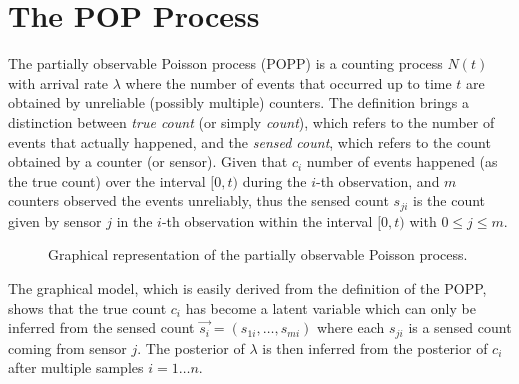 \section{The POP Process}
\label{sec:popp}

The partially observable Poisson process (POPP) is a counting process $N(t)$ with arrival rate $\lambda$ where the number of events that occurred up to time $t$ are obtained by unreliable (possibly multiple) counters. The definition brings a distinction between \emph{true count} (or simply \emph{count}), which refers to the number of events that actually happened, and the \emph{sensed count}, which refers to the count obtained by a counter (or sensor). Given that $c_i$ number of events happened (as the true count) over the interval $[0, t)$ during the $i$-th observation, and $m$ counters observed the events unreliably, thus the sensed count $s_{ji}$ is the count given by sensor $j$ in the $i$-th observation within the interval $[0, t)$ with $0 \leq j \leq m$. 

\begin{figure}[t!]
	\centering
    \caption{Graphical representation of the partially observable Poisson process.}
	\label{fig:gm_popp}
\end{figure}

The graphical model, which is easily derived from the definition of the POPP, shows that the true count $c_i$ has become a latent variable which can only be inferred from the sensed count $\overrightarrow{s_i} = (s_{1i}, \ldots, s_{mi})$ where each $s_{ji}$ is a sensed count coming from sensor $j$. The posterior of $\lambda$ is then inferred from the posterior of $c_i$ after multiple samples $i = 1 \ldots n$.

